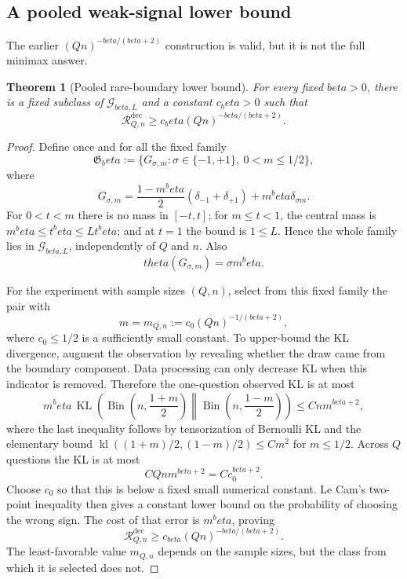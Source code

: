 \documentclass[11pt]{article}
\def\beta{beta}%
\def\theta{theta}%
\newtheorem{theorem}{Theorem}[section]
\newcommand{\KL}{\operatorname{KL}}
\newcommand{\Bin}{\operatorname{Bin}}
\newcommand{\calG}{\mathcal G}
\newcommand{\calR}{\mathcal R}
\begin{document}
\subsection{A pooled weak-signal lower bound}

The earlier $(Qn)^{-\beta/(\beta+2)}$ construction is valid, but it is not the full minimax answer.

\begin{theorem}[Pooled rare-boundary lower bound]
\label{thm:pooled-lower}
For every fixed $\beta>0$, there is a fixed subclass of $\calG_{\beta,L}$ and a constant $c_\beta>0$ such that
\begin{equation}
\label{eq:pooled-lower}
\calR^{\mathrm{dec}}_{Q,n}
\ge
c_\beta(Qn)^{-\beta/(\beta+2)}.
\end{equation}
\end{theorem}

\begin{proof}
Define once and for all the fixed family
\[
\mathfrak G_\beta
:=
\{G_{\sigma,m}:\sigma\in\{-1,+1\},\ 0<m\le1/2\},
\]
where
\[
G_{\sigma,m}
=
\frac{1-m^\beta}{2}(\delta_{-1}+\delta_{+1})
+m^\beta\delta_{\sigma m}.
\]
For $0<t<m$ there is no mass in $[-t,t]$; for $m\le t<1$, the central mass is $m^\beta\le t^\beta\le Lt^\beta$; and at $t=1$ the bound is $1\le L$.  Hence the whole family lies in $\calG_{\beta,L}$, independently of $Q$ and $n$.  Also
\[
\theta(G_{\sigma,m})=\sigma m^\beta.
\]

For the experiment with sample sizes $(Q,n)$, select from this fixed family the pair with
\[
m=m_{Q,n}:=c_0(Qn)^{-1/(\beta+2)},
\]
where $c_0\le1/2$ is a sufficiently small constant.  To upper-bound the KL divergence, augment the observation by revealing whether the draw came from the boundary component.  Data processing can only decrease KL when this indicator is removed.  Therefore the one-question observed KL is at most
\[
m^\beta\,
\KL\!\left(
\Bin\left(n,\frac{1+m}{2}\right)
\middle\|
\Bin\left(n,\frac{1-m}{2}\right)
\right)
\le Cnm^{\beta+2},
\]
where the last inequality follows by tensorization of Bernoulli KL and the elementary bound
$\operatorname{kl}((1+m)/2,(1-m)/2)\le Cm^2$ for $m\le1/2$.  Across $Q$ questions the KL is at most
\[
CQnm^{\beta+2}=Cc_0^{\beta+2}.
\]
Choose $c_0$ so that this is below a fixed small numerical constant.  Le Cam's two-point inequality then gives a constant lower bound on the probability of choosing the wrong sign.  The cost of that error is $m^\beta$, proving
\[
\calR^{\mathrm{dec}}_{Q,n}
\ge c_{\beta}(Qn)^{-\beta/(\beta+2)}.
\]
The least-favorable value $m_{Q,n}$ depends on the sample sizes, but the class from which it is selected does not.
\end{proof}
\end{document}
